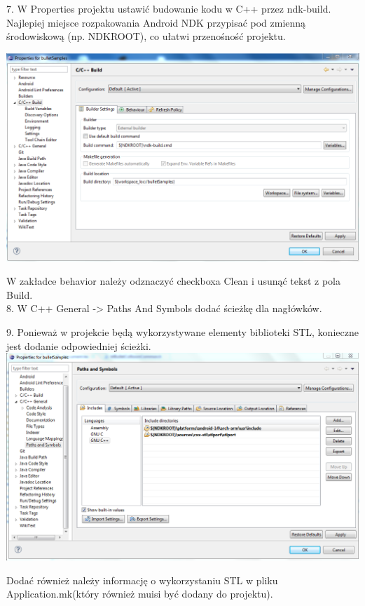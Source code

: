 \documentclass[12pt]{article}
\begin{document}
  7. W Properties projektu ustawić budowanie kodu w C++ przez ndk-build.
  Najlepiej miejsce rozpakowania Android NDK przypisać pod zmienną środowiskową
  (np. NDKROOT), co ułatwi przenośność projektu.
  
  \includegraphics[width=\textwidth]{./img/properties.png}
  
  W zakładce behavior należy odznaczyć checkboxa Clean i usunąć tekst z pola
  Build.\\
  8. W C++ General -> Paths And Symbols dodać ścieżkę dla nagłówków.
 
  9. Ponieważ w projekcie będą wykorzystywane elementy biblioteki STL, konieczne
  jest dodanie odpowiedniej ścieżki.\\
  
  \includegraphics[width=\textwidth]{./img/ndkroot.png}
  
  Dodać również należy informację o wykorzystaniu STL w pliku
  Application.mk(który również muisi być dodany do projektu).
  
  
  
\end{document}
